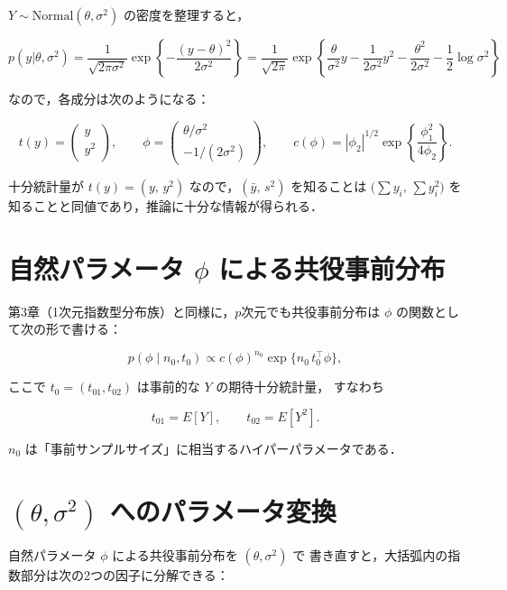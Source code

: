 \documentclass[lualatex,ja=standard,a4paper,12pt]{bxjsarticle}
\begin{document}
$Y \sim \mathrm{Normal}(\theta, \sigma^2)$ の密度を整理すると，

\[
  p(y|\theta,\sigma^2)
  = \frac{1}{\sqrt{2\pi\sigma^2}}\exp\!\left\{-\frac{(y-\theta)^2}{2\sigma^2}\right\}
  = \frac{1}{\sqrt{2\pi}}\exp\!\left\{\frac{\theta}{\sigma^2}y - \frac{1}{2\sigma^2}y^2
    - \frac{\theta^2}{2\sigma^2} - \frac{1}{2}\log\sigma^2\right\}
\]

なので，各成分は次のようになる：

\[
  t(y) = \begin{pmatrix}y \\ y^2\end{pmatrix},
  \qquad
  \phi = \begin{pmatrix}\theta/\sigma^2 \\ -1/(2\sigma^2)\end{pmatrix},
  \qquad
  c(\phi) = |\phi_2|^{1/2}\exp\!\left\{\frac{\phi_1^2}{4\phi_2}\right\}.
\]

\begin{pointbox}
十分統計量が $t(y) = (y,\, y^2)$ なので，$(\bar{y},\, s^2)$ を知ることは
$\bigl(\sum y_i,\, \sum y_i^2\bigr)$ を知ることと同値であり，推論に十分な情報が得られる．
\end{pointbox}

\section{自然パラメータ $\phi$ による共役事前分布}

第3章（1次元指数型分布族）と同様に，$p$次元でも共役事前分布は
$\phi$ の関数として次の形で書ける：

\[
  p(\phi \mid n_0, t_0)
  \propto c(\phi)^{n_0} \exp\!\bigl\{n_0\, t_0^\top \phi\bigr\},
\]

ここで $t_0 = (t_{01}, t_{02})$ は事前的な $Y$ の期待十分統計量，
すなわち

\[
  t_{01} = E[Y], \qquad t_{02} = E[Y^2].
\]

$n_0$ は「事前サンプルサイズ」に相当するハイパーパラメータである．

\section{$(\theta, \sigma^2)$ へのパラメータ変換}

自然パラメータ $\phi$ による共役事前分布を $(\theta, \sigma^2)$ で
書き直すと，大括弧内の指数部分は次の2つの因子に分解できる：
\end{document}
